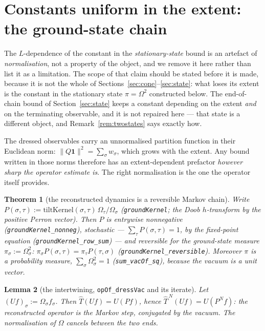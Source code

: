 \documentclass[11pt]{article}
\newtheorem{theorem}{Theorem}[section]
\newtheorem{lemma}[theorem]{Lemma}
\newcommand{\lean}[1]{\texttt{#1}}
\begin{document}
\section{Constants uniform in the extent: the ground-state chain}
\label{sec:ground}
The $L$-dependence of the constant in the \emph{stationary-state}
bound is an artefact of \emph{normalisation}, not a property of the
object, and we remove it here rather than list it as a limitation.  The
scope of that claim should be stated before it is made, because it is
not the whole of Sections~\ref{sec:cone}--\ref{sec:state}: what loses
its extent is the constant in the stationary state $\pi = \Omega^2$
constructed below.  The end-of-chain bound of Section~\ref{sec:state}
keeps a constant depending on the extent \emph{and} on the terminating
observable, and it is not repaired here --- that state is a different
object, and Remark~\ref{rem:twostates} says exactly how.

The dressed observables carry an unnormalised partition function in
their Euclidean norm: $\lVert Q\mathbf 1\rVert^2 = \sum_\sigma w_\sigma$,
which grows with the extent.  Any bound written in those norms
therefore has an extent-dependent prefactor \emph{however sharp the
operator estimate is}.  The right normalisation is the one the
operator itself provides.

\begin{theorem}[the reconstructed dynamics is a reversible Markov
chain]
Write $P(\sigma,\tau) := \mathrm{tiltKernel}(\sigma,\tau)\,
\Omega_\tau/\Omega_\sigma$ (\lean{groundKernel}; the Doob
$h$-transform by the positive Perron vector).  Then $P$ is entrywise
nonnegative (\lean{groundKernel\_nonneg}), stochastic ---
$\sum_\tau P(\sigma,\tau) = 1$, by the fixed-point equation
(\lean{groundKernel\_row\_sum}) --- and reversible for the ground-state
measure $\pi_\sigma := \Omega_\sigma^2$:
$\pi_\sigma P(\sigma,\tau) = \pi_\tau P(\tau,\sigma)$
(\lean{groundKernel\_reversible}).  Moreover $\pi$ is a probability
measure, $\sum_\sigma \Omega_\sigma^2 = 1$
(\lean{sum\_vacOf\_sq}), because the vacuum is a unit vector.
\end{theorem}

\begin{lemma}[the intertwining, \lean{opOf\_dressVac} and its iterate]
Let $(Uf)_\sigma := \Omega_\sigma f_\sigma$.  Then
$\hat T (Uf) = U(Pf)$, hence $\hat T^{\,N}(Uf) = U(P^N f)$: the
reconstructed operator \emph{is} the Markov step, conjugated by the
vacuum.  The normalisation of $\Omega$ cancels between the two ends.
\end{lemma}
\end{document}

